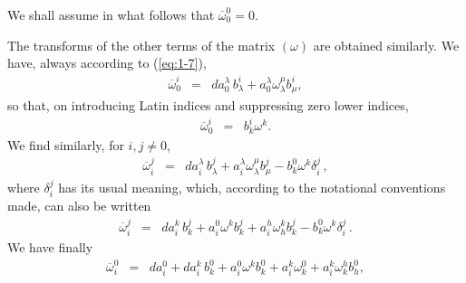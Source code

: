We shall assume in what follows that $\overline \omega^0_0=0$.

The transforms of the other terms of the matrix $(\omega)$ are obtained similarly. We have, always according to (\ref{eq:1-7}),
\begin{eqnarray*}
\overline \omega^i_0 &=& da^\lambda_0 \, b^i_\lambda + a^\lambda_0 \omega^\mu_\lambda b^i_\mu ,
\end{eqnarray*}
so that, on introducing Latin indices and suppressing zero lower indices, 
\begin{eqnarray*}
\overline \omega^i_0 &=& b^i_k \omega^k .
\end{eqnarray*}
We find similarly, for $i,j \neq 0$,
\begin{eqnarray*}
\overline \omega^j_i &=& da^\lambda_i \, b^j_\lambda + a^\lambda_i \omega^\mu_\lambda b^j_\mu - b^0_k \omega^k \delta^j_i\, ,
\end{eqnarray*}
where $\delta^j_i$ has its usual meaning, which, according to the notational conventions made, can also be written
\begin{eqnarray*}
\overline \omega^j_i &=& da^k_i \, b^j_k + a^0_i \omega^k b^j_k + a^h_i \omega^k_h b^j_k - b^0_k \omega^k \delta^j_i\, .
\end{eqnarray*}
We have finally 
\begin{eqnarray*}
\overline \omega^0_i &=& da^0_i  + da^k_i \, b^0_k 
+ a^0_i \omega^k b^0_k 
+ a^k_i \omega^0_k 
+ a^k_i \omega^h_k b^0_h,
\end{eqnarray*}











































































